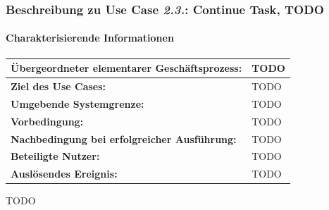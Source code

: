 				\pagebreak
				
				
			\subsubsection{Beschreibung zu Use Case \emph{2.3.}: Continue Task, TODO}
			
			\paragraph*{Charakterisierende Informationen}
			
			\begin{table}[H]
				\centering
				\begin{tabularx}{\textwidth}{|p{5cm}|X|}
					\hline
					\textbf{Übergeordneter elementarer Geschäftsprozess:} & TODO  \\ \hline
					\textbf{Ziel des Use Cases:} & TODO \\ \hline
					\textbf{Umgebende Systemgrenze:} & TODO \\ \hline
					\textbf{Vorbedingung:} & TODO \\ \hline
					\textbf{Nachbedingung bei erfolgreicher Ausführung:} & TODO \\ \hline
					\textbf{Beteiligte Nutzer:} & TODO \\ \hline
					\textbf{Auslösendes Ereignis:} & TODO \\
					\hline
				\end{tabularx}
			\end{table}
			
			TODO
			
			
			\pagebreak
